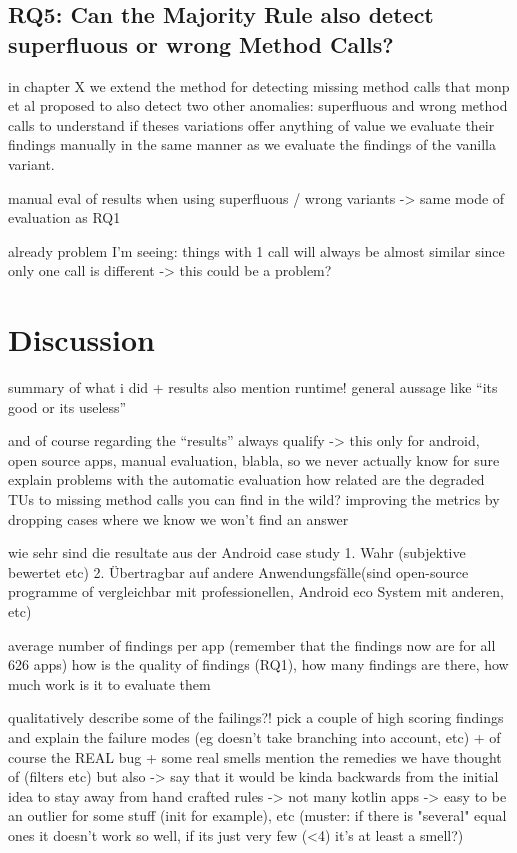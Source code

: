 \subsection{RQ5: Can the Majority Rule also detect superfluous or wrong Method Calls?}

in chapter X we extend the method for detecting missing method calls that monp et al proposed to also detect two other anomalies:
superfluous and wrong method calls
to understand if theses variations offer anything of value we evaluate their findings manually in the same manner as we evaluate the findings of the vanilla variant.

manual eval of results when using superfluous / wrong variants
-> same mode of evaluation as RQ1

already problem I'm seeing: things with 1 call will always be almost similar since only one call is different
 -> this could be a problem?

\section{Discussion}

summary of what i did + results
also mention runtime!
general aussage like ``its good or its useless''

and of course regarding the ``results'' always qualify -> this only for android, open source apps, manual evaluation, blabla, so we never actually know for sure
explain problems with the automatic evaluation
how related are the degraded TUs to missing method calls you can find in the wild?
improving the metrics by dropping cases where we know we won't find an answer

wie sehr sind die resultate aus der Android case study 1. Wahr (subjektive bewertet etc) 2. Übertragbar auf andere Anwendungsfälle(sind open-source programme of vergleichbar mit professionellen, Android eco System mit anderen, etc)

average number of findings per app (remember that the findings now are for all 626 apps)
how is the quality of findings (RQ1), how many findings are there, how much work is it to evaluate them

qualitatively describe some of the failings?! 
pick a couple of high scoring findings and explain the failure modes (eg doesn't take branching into account, etc)
+ of course the REAL bug + some real smells
mention the remedies we have thought of (filters etc) but also -> say that it would be kinda backwards from the initial idea to stay away from hand crafted rules
-> not many kotlin apps -> easy to be an outlier for some stuff (init for example), etc
(muster: if there is "several" equal ones it doesn't work so well, if its just very few (<4) it's at least a smell?)

